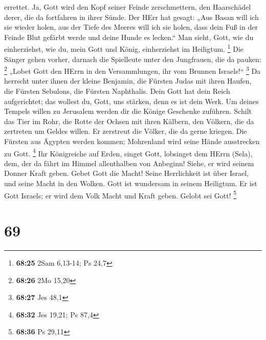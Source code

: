 errettet.  Ja, Gott wird den Kopf seiner Feinde
zerschmettern, den Haarschädel derer, die da fortfahren in ihrer Sünde.
 Der HErr hat gesagt: „Aus Basan will ich sie wieder holen,
aus der Tiefe des Meeres will ich sie holen,  dass dein Fuß
in der Feinde Blut gefärbt werde und deine Hunde es lecken.``
 Man sieht, Gott, wie du einherziehst, wie du, mein Gott
und König, einherziehst im Heiligtum. \footnote{\textbf{68:25} 2Sam
  6,13-14; Ps 24,7}  Die Sänger gehen vorher, darnach die
Spielleute unter den Jungfrauen, die da pauken: \footnote{\textbf{68:26}
  2Mo 15,20}  „Lobet Gott den HErrn in den Versammlungen,
ihr vom Brunnen Israels!{}`` \footnote{\textbf{68:27} Jes 48,1}
 Da herrscht unter ihnen der kleine Benjamin, die Fürsten
Judas mit ihren Haufen, die Fürsten Sebulons, die Fürsten Naphthalis.
 Dein Gott hat dein Reich aufgerichtet; das wollest du,
Gott, uns stärken, denn es ist dein Werk.  Um deines
Tempels willen zu Jerusalem werden dir die Könige Geschenke zuführen.
 Schilt das Tier im Rohr, die Rotte der Ochsen mit ihren
Kälbern, den Völkern, die da zertreten um Geldes willen. Er zerstreut
die Völker, die da gerne kriegen.  Die Fürsten aus Ägypten
werden kommen; Mohrenland wird seine Hände ausstrecken zu Gott.
\footnote{\textbf{68:32} Jes 19,21; Ps 87,4}  Ihr
Königreiche auf Erden, singet Gott, lobsinget dem HErrn (Sela),
 dem, der da fährt im Himmel allenthalben von Anbeginn!
Siehe, er wird seinem Donner Kraft geben.  Gebet Gott die
Macht! Seine Herrlichkeit ist über Israel, und seine Macht in den
Wolken.  Gott ist wundersam in seinem Heiligtum. Er ist
Gott Israels; er wird dem Volk Macht und Kraft geben. Gelobt sei Gott!
\footnote{\textbf{68:36} Ps 29,11}

\hypertarget{section-26}{%
\section{69}\label{section-26}}

